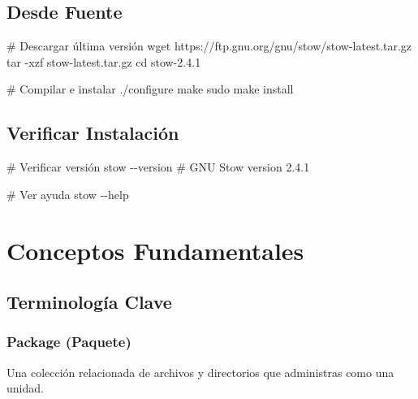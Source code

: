\documentclass[
  doc,
  floatsintext,
  longtable,
  a4paper,
  nolmodern,
  notxfonts,
  notimes,
  12pt,
  colorlinks=true,linkcolor=blue,citecolor=blue,urlcolor=blue]{apa7}
\newenvironment{Shaded}{\begin{snugshade}}{\end{snugshade}}
\newcommand{\AttributeTok}[1]{\textcolor[rgb]{0.40,0.45,0.13}{#1}}
\newcommand{\BuiltInTok}[1]{\textcolor[rgb]{0.00,0.23,0.31}{#1}}
\newcommand{\CommentTok}[1]{\textcolor[rgb]{0.37,0.37,0.37}{#1}}
\newcommand{\ExtensionTok}[1]{\textcolor[rgb]{0.00,0.23,0.31}{#1}}
\newcommand{\FunctionTok}[1]{\textcolor[rgb]{0.28,0.35,0.67}{#1}}
\newcommand{\NormalTok}[1]{\textcolor[rgb]{0.00,0.23,0.31}{#1}}
\begin{document}
\subsection{Desde Fuente}\label{desde-fuente}

\begin{Shaded}
\begin{Highlighting}[]
\CommentTok{\# Descargar última versión}
\FunctionTok{wget}\NormalTok{ https://ftp.gnu.org/gnu/stow/stow{-}latest.tar.gz}
\FunctionTok{tar} \AttributeTok{{-}xzf}\NormalTok{ stow{-}latest.tar.gz}
\BuiltInTok{cd}\NormalTok{ stow{-}2.4.1}

\CommentTok{\# Compilar e instalar}
\ExtensionTok{./configure}
\FunctionTok{make}
\FunctionTok{sudo}\NormalTok{ make install}
\end{Highlighting}
\end{Shaded}

\subsection{Verificar Instalación}\label{verificar-instalaciuxf3n}

\begin{Shaded}
\begin{Highlighting}[]
\CommentTok{\# Verificar versión}
\ExtensionTok{stow} \AttributeTok{{-}{-}version}
\CommentTok{\# GNU Stow version 2.4.1}

\CommentTok{\# Ver ayuda}
\ExtensionTok{stow} \AttributeTok{{-}{-}help}
\end{Highlighting}
\end{Shaded}

\section{Conceptos Fundamentales}\label{conceptos-fundamentales}

\subsection{Terminología Clave}\label{terminologuxeda-clave}

\subsubsection{Package (Paquete)}\label{package-paquete}

Una colección relacionada de archivos y directorios que administras como
una unidad.
\end{document}
